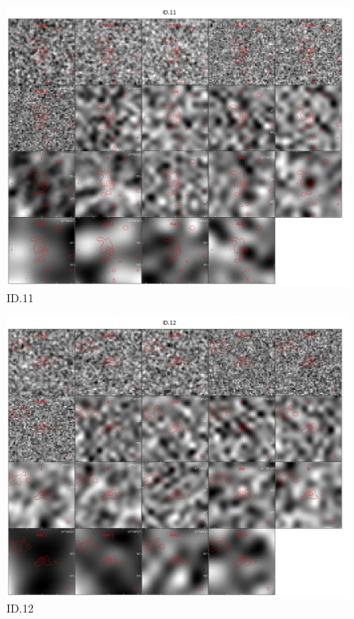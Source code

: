 \begin{figure}[tbp]
\centering \includegraphics[width=160mm]{Matched/ASPECS_Cutout_10.jpg}
\caption{ID.11}
\label{fig:Match_Three}
\end{figure}

\begin{figure}[tbp]
\centering \includegraphics[width=160mm]{Matched/ASPECS_Cutout_11.jpg}
\caption{ID.12}
\label{fig:Match_Three}
\end{figure}

